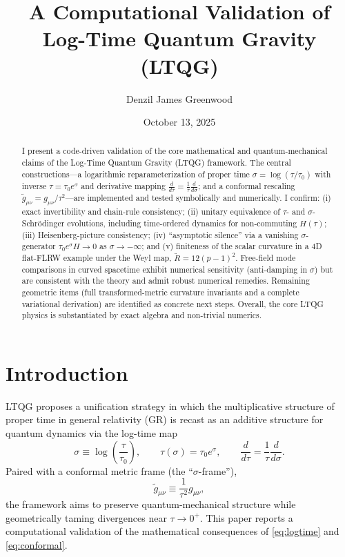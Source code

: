 \documentclass[11pt]{article}
\title{A Computational Validation of Log-Time Quantum Gravity (LTQG)}
\author{Denzil James Greenwood}
\date{October 13, 2025}
\begin{document}
\maketitle

\begin{abstract}
I present a code-driven validation of the core mathematical and quantum-mechanical claims of the Log-Time Quantum Gravity (LTQG) framework. The central constructions---a logarithmic reparameterization of proper time
$\sigma=\log(\tau/\tau_0)$ with inverse $\tau=\tau_0 e^{\sigma}$ and derivative mapping $\frac{d}{d\tau}=\frac{1}{\tau}\frac{d}{d\sigma}$; and a conformal rescaling $\tilde g_{\mu\nu}=g_{\mu\nu}/\tau^2$---are implemented and tested symbolically and numerically. I confirm: (i) exact invertibility and chain-rule consistency; (ii) unitary equivalence of $\tau$- and $\sigma$-Schr\"odinger evolutions, including time-ordered dynamics for non-commuting $H(\tau)$; (iii) Heisenberg-picture consistency; (iv) ``asymptotic silence'' via a vanishing $\sigma$-generator $\tau_0 e^{\sigma}H\to 0$ as $\sigma\to-\infty$; and (v) finiteness of the scalar curvature in a 4D flat-FLRW example under the Weyl map, $\tilde R=12(p-1)^2$. Free-field mode comparisons in curved spacetime exhibit numerical sensitivity (anti-damping in $\sigma$) but are consistent with the theory and admit robust numerical remedies. Remaining geometric items (full transformed-metric curvature invariants and a complete variational derivation) are identified as concrete next steps. Overall, the core LTQG physics is substantiated by exact algebra and non-trivial numerics.
\end{abstract}

\section{Introduction}
LTQG proposes a unification strategy in which the multiplicative structure of proper time in general relativity (GR) is recast as an additive structure for quantum dynamics via the log-time map
\begin{equation}
\sigma \equiv \log\!\left(\frac{\tau}{\tau_0}\right),
\qquad
\tau(\sigma)=\tau_0 e^{\sigma},
\qquad
\frac{d}{d\tau}=\frac{1}{\tau}\frac{d}{d\sigma}.
\label{eq:logtime}
\end{equation}
Paired with a conformal metric frame (the ``$\sigma$-frame''),
\begin{equation}
\tilde g_{\mu\nu} \equiv \frac{1}{\tau^2} g_{\mu\nu},
\label{eq:conformal}
\end{equation}
the framework aims to preserve quantum-mechanical structure while geometrically taming divergences near $\tau\to 0^+$. This paper reports a computational validation of the mathematical consequences of \eqref{eq:logtime} and \eqref{eq:conformal}.
\end{document}
